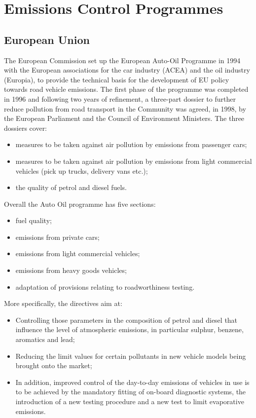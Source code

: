 \section{Emissions Control Programmes}
\subsection{European Union}
The European Commission set up the European Auto-Oil Programme in 1994 with the European associations for the car industry (ACEA) and the oil industry (Europia), to provide the technical basis for the development of EU policy towards road vehicle emissions. The first phase of the programme was completed in 1996 and following two years of refinement, a three-part dossier to further reduce pollution from road transport in the Community was agreed, in 1998, by the European Parliament and the Council of Environment Ministers. The three dossiers cover:
\begin{itemize}
	\item measures to be taken against air pollution by emissions from passenger cars;
	\item measures to be taken against air pollution by emissions from light commercial vehicles (pick up trucks, delivery vans etc.);
	\item the quality of petrol and diesel fuels.
\end{itemize}
Overall the Auto Oil programme has five sections:
\begin{itemize}
	\item fuel quality;
	\item emissions from private cars;
	\item emissions from light commercial vehicles;
	\item emissions from heavy goods vehicles;
	\item adaptation of provisions relating to roadworthiness testing.
\end{itemize}
More specifically, the directives aim at:
\begin{itemize}
	\item Controlling those parameters in the composition of petrol and diesel that influence the level of atmospheric emissions, in particular sulphur, benzene, aromatics and lead;
	\item Reducing the limit values for certain pollutants in new vehicle models being brought onto the market;
	\item In addition, improved control of the day-to-day emissions of vehicles in use is to be achieved by the mandatory fitting of on-board diagnostic systems, the introduction of a new testing procedure and a new test to limit evaporative emissions.
\end{itemize}

